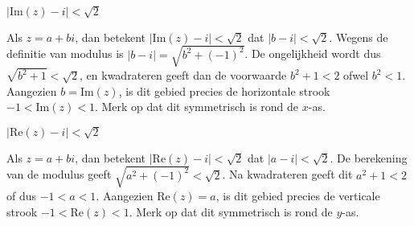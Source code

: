 \documentclass{ximera}
\begin{document}
\begin{exercise}
\begin{question}
\begin{oplossing}
\begin{image}[0.5\textwidth]
\end{image}
\end{oplossing}            
\end{question}  


                
\begin{question} 
$|\text{Im}(z)-i| < \sqrt{2}$
\begin{oplossing} Als $z=a+bi$, dan betekent $|\text{Im}(z) - i| < \sqrt{2} $ dat $|b-i| < \sqrt{2}$. Wegens de definitie van modulus is $|b-i|= \sqrt{b^2 + (-1)^2}$. De ongelijkheid wordt dus $\sqrt{b^2 + 1} < \sqrt{2}$, en kwadrateren geeft dan de voorwaarde $b^2 + 1 < 2$ ofwel $b^2 < 1$. Aangezien $b = \text{Im}(z)$, is dit gebied precies de horizontale strook $-1 < \text{Im}(z) < 1$. Merk op dat dit symmetrisch is rond de $x$-as. 

\begin{image}[0.5\textwidth]
\end{image}
\end{oplossing}            
\end{question}

\begin{question} 
$|\text{Re}(z)-i| < \sqrt{2}$
\begin{oplossing} 
Als $z=a+bi$, dan betekent $|\text{Re}(z) - i| < \sqrt{2} $ dat $|a-i|<\sqrt{2}$. De berekening van de modulus geeft $\sqrt{a^2 +(-1)^2}< \sqrt{2}$. Na kwadrateren geeft dit $a^2+1 < 2$ of dus $-1 < a < 1$. Aangezien $\text{Re}(z) = a$, is dit gebied precies de verticale strook $-1 < \text{Re}(z) < 1$. Merk op dat dit symmetrisch is rond de $y$-as.
            
\begin{image}[0.4\textwidth]
\end{image}
\end{oplossing}
\end{question}
\end{exercise}
\end{document}
